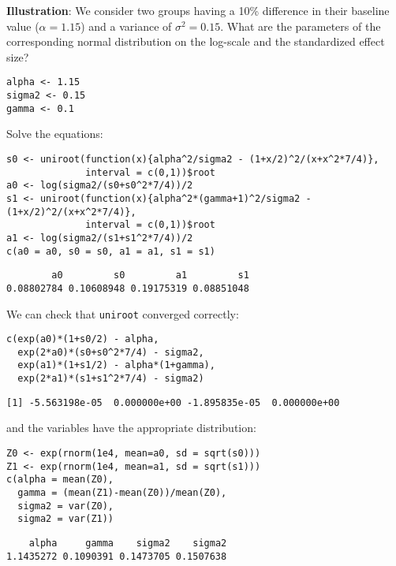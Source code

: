 \documentclass[12pt]{article}
\begin{document}
\textbf{Illustration}: We consider two groups having a 10\% difference
in their baseline value (\(\alpha=1.15\)) and a variance of \(\sigma^2
= 0.15\). What are the parameters of the corresponding normal
distribution on the log-scale and the standardized effect size?
\lstset{language=r,label= ,caption= ,captionpos=b,numbers=none}
\begin{lstlisting}
alpha <- 1.15
sigma2 <- 0.15
gamma <- 0.1
\end{lstlisting}

Solve the equations:
\lstset{language=r,label= ,caption= ,captionpos=b,numbers=none}
\begin{lstlisting}
s0 <- uniroot(function(x){alpha^2/sigma2 - (1+x/2)^2/(x+x^2*7/4)},
			  interval = c(0,1))$root
a0 <- log(sigma2/(s0+s0^2*7/4))/2
s1 <- uniroot(function(x){alpha^2*(gamma+1)^2/sigma2 - (1+x/2)^2/(x+x^2*7/4)},
			  interval = c(0,1))$root
a1 <- log(sigma2/(s1+s1^2*7/4))/2
c(a0 = a0, s0 = s0, a1 = a1, s1 = s1)
\end{lstlisting}

\begin{verbatim}
        a0         s0         a1         s1 
0.08802784 0.10608948 0.19175319 0.08851048
\end{verbatim}

We can check that \texttt{uniroot} converged correctly:
\lstset{language=r,label= ,caption= ,captionpos=b,numbers=none}
\begin{lstlisting}
c(exp(a0)*(1+s0/2) - alpha, 
  exp(2*a0)*(s0+s0^2*7/4) - sigma2, 
  exp(a1)*(1+s1/2) - alpha*(1+gamma), 
  exp(2*a1)*(s1+s1^2*7/4) - sigma2)
\end{lstlisting}

\begin{verbatim}
[1] -5.563198e-05  0.000000e+00 -1.895835e-05  0.000000e+00
\end{verbatim}

and the variables have the appropriate distribution:
\lstset{language=r,label= ,caption= ,captionpos=b,numbers=none}
\begin{lstlisting}
Z0 <- exp(rnorm(1e4, mean=a0, sd = sqrt(s0)))
Z1 <- exp(rnorm(1e4, mean=a1, sd = sqrt(s1)))
c(alpha = mean(Z0), 
  gamma = (mean(Z1)-mean(Z0))/mean(Z0), 
  sigma2 = var(Z0), 
  sigma2 = var(Z1))
\end{lstlisting}

\begin{verbatim}
    alpha     gamma    sigma2    sigma2 
1.1435272 0.1090391 0.1473705 0.1507638
\end{verbatim}
\end{document}
